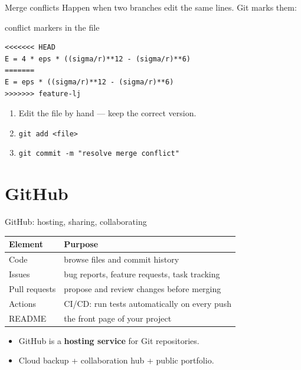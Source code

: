 \documentclass[aspectratio=169]{beamer}
\begin{document}
\begin{frame}[fragile]{Merge conflicts}
  Happen when two branches edit the same lines. Git marks them:
  \begin{block}{conflict markers in the file}
    \begin{lstlisting}
<<<<<<< HEAD
E = 4 * eps * ((sigma/r)**12 - (sigma/r)**6)
=======
E = eps * ((sigma/r)**12 - (sigma/r)**6)
>>>>>>> feature-lj
    \end{lstlisting}
  \end{block}
  \begin{enumerate}
    \item Edit the file by hand --- keep the correct version.
    \item \texttt{git add <file>}
    \item \texttt{git commit -m "resolve merge conflict"}
  \end{enumerate}
\end{frame}

\section{GitHub}

\begin{frame}{GitHub: hosting, sharing, collaborating}
  \begin{table}
    \small
    \begin{tabular}{@{}ll@{}}
      \toprule
      Element & Purpose \\
      \midrule
      Code & browse files and commit history \\
      Issues & bug reports, feature requests, task tracking \\
      Pull requests & propose and review changes before merging \\
      Actions & CI/CD: run tests automatically on every push \\
      README & the front page of your project \\
      \bottomrule
    \end{tabular}
  \end{table}
  \vspace{0.3cm}
  \begin{itemize}
    \item GitHub is a \textbf{hosting service} for Git repositories.
    \item Cloud backup + collaboration hub + public portfolio.
  \end{itemize}
\end{frame}
\end{document}
